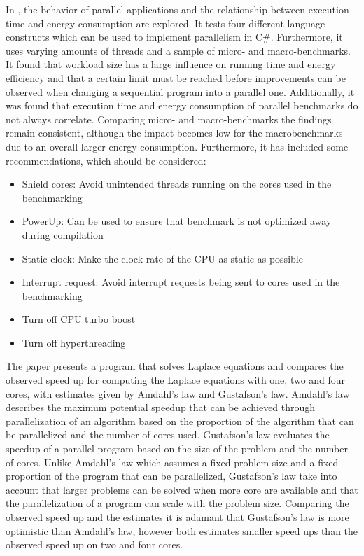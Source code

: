 In \cite{Lindholt}, the behavior of parallel applications and the relationship between execution time and energy consumption are explored. It tests four different language constructs which can be used to implement parallelism in C\#. Furthermore, it uses varying amounts of threads and a sample of micro- and macro-benchmarks. It found that workload size has a large influence on running time and energy efficiency and that a certain limit must be reached before improvements can be observed when changing a sequential program into a parallel one. Additionally, it was found that execution time and energy consumption of parallel benchmarks do not always correlate. Comparing micro- and macro-benchmarks the findings remain consistent, although the impact becomes low for the macrobenchmarks due to an overall larger energy consumption. Furthermore, it has included some recommendations, which should be considered:\cite{Lindholt}

\begin{itemize}
    \item Shield cores: Avoid unintended threads running on the cores used in the benchmarking
    \item PowerUp: Can be used to ensure that benchmark is not optimized away during compilation
    \item Static clock: Make the clock rate of the CPU as static as possible
    \item Interrupt request: Avoid interrupt requests being sent to cores used in the benchmarking 
    \item Turn off CPU turbo boost
    \item Turn off hyperthreading
\end{itemize}

The paper \cite{prinslow2011overview} presents a program that solves Laplace equations and compares the observed speed up for computing the Laplace equations with one, two and four cores, with estimates given by Amdahl's law and Gustafson's law.  Amdahl's law describes the maximum potential speedup that can be achieved through parallelization of an algorithm based on the proportion of the algorithm that can be parallelized and the number of cores used. Gustafson's law evaluates the speedup of a parallel program based on the size of the problem and the number of cores. Unlike Amdahl's law which assumes a fixed problem size and a fixed proportion of the program that can be parallelized, Gustafson's law take into account that larger problems can be solved when more core are available and that the parallelization of a program can scale with the problem size. Comparing the observed speed up and the estimates it is adamant that Gustafson's law is more optimistic than Amdahl's law, however both estimates smaller speed ups than the observed speed up on two and four cores. \cite{prinslow2011overview}

